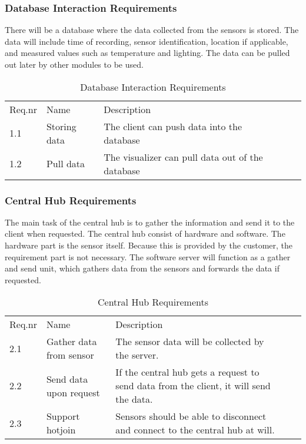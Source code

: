 \documentclass[../document]{subfiles}
\begin{document}
\subsubsection{Database Interaction Requirements}
There will be a database where the data collected from the sensors is stored. The data will include time of recording, sensor identification, location if applicable, and measured values such as temperature and lighting. The data can be pulled out later by other modules to be used. 

\begin{table}[H]
\caption{Database Interaction Requirements}
\centering
\begin{tabularx}{\textwidth}{|l|X|X|l|X|}
\hline
\\ \hline Req.nr
&Name
&Description
\\ \hline 1.1
&Storing data
&The client can push data into the database
\\ \hline 1.2
&Pull data
&The visualizer can pull data out of the database
\\ \hline 
\end{tabularx}
\end{table}

\subsubsection{Central Hub Requirements}
The main task of the central hub is to gather the information and send it to the client when requested. The central hub consist of hardware and software. The hardware part is the sensor itself. Because this is provided by the customer, the requirement part is not necessary. The software server will function as a gather and send unit, which gathers data from the sensors and forwards the data if requested.

\begin{table}[H]
\caption{Central Hub Requirements}
\centering
\begin{tabularx}{\textwidth}{|l|X|X|l|X|}
\hline
\\ \hline Req.nr
&Name
&Description
\\ \hline 2.1
&Gather data from sensor
&The sensor data will be collected by the server.
\\ \hline 2.2
&Send data upon request
&If the central hub gets a request to send data from the client, it will send the data.
\\ \hline 2.3
&Support hotjoin
&Sensors should be able to disconnect and connect to the central hub at will.
\\ \hline 
\end{tabularx}
\end{table}
\end{document}
